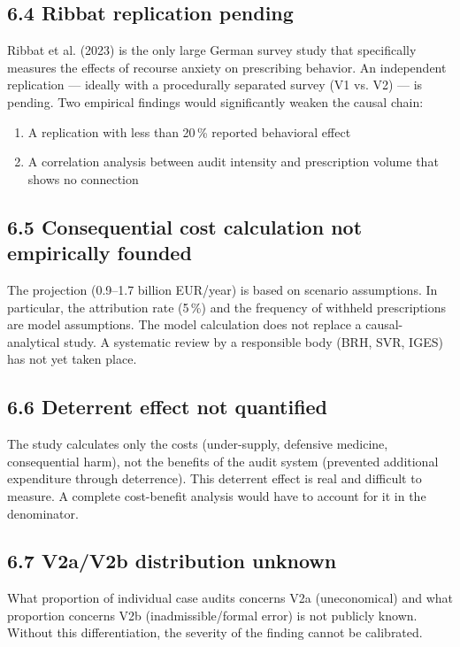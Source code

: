 \documentclass{umbruch-position}
\begin{document}
\subsection*{6.4 Ribbat replication pending}

Ribbat et al. (2023) is the only large German survey study that specifically measures the effects of recourse anxiety on prescribing behavior. An independent replication --- ideally with a procedurally separated survey (V1 vs. V2) --- is pending. Two empirical findings would significantly weaken the causal chain:

\begin{enumerate}
  \item A replication with less than 20\,\% reported behavioral effect
  \item A correlation analysis between audit intensity and prescription volume that shows no connection
\end{enumerate}

\subsection*{6.5 Consequential cost calculation not empirically founded}

The projection (0.9--1.7 billion EUR/year) is based on scenario assumptions. In particular, the attribution rate (5\,\%) and the frequency of withheld prescriptions are model assumptions. The model calculation does not replace a causal-analytical study. A systematic review by a responsible body (BRH, SVR, IGES) has not yet taken place.

\subsection*{6.6 Deterrent effect not quantified}

The study calculates only the costs (under-supply, defensive medicine, consequential harm), not the benefits of the audit system (prevented additional expenditure through deterrence). This deterrent effect is real and difficult to measure. A complete cost-benefit analysis would have to account for it in the denominator.

\subsection*{6.7 V2a/V2b distribution unknown}

What proportion of individual case audits concerns V2a (uneconomical) and what proportion concerns V2b (inadmissible/formal error) is not publicly known. Without this differentiation, the severity of the finding cannot be calibrated.
\end{document}
